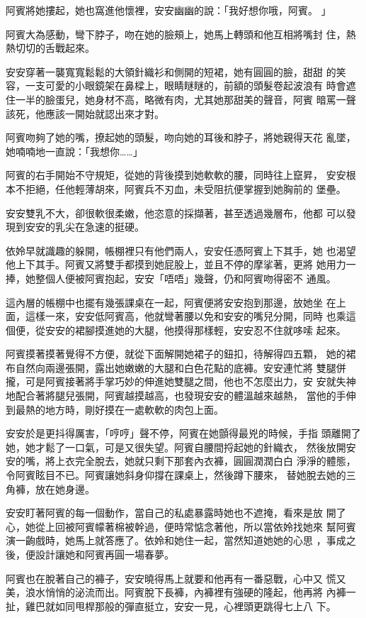 阿賓將她摟起，她也窩進他懷裡，安安幽幽的說：「我好想你哦，阿賓。
」

阿賓大為感動，彎下脖子，吻在她的臉頰上，她馬上轉頭和他互相將嘴封
住，熱熱切切的舌戰起來。

安安穿著一襲寬寬鬆鬆的大領針織衫和側開的短裙，她有圓圓的臉，甜甜
的笑容，一支可愛的小眼鏡架在鼻樑上，眼睛瞇瞇的，前額的頭髮卷起波浪有
時會遮住一半的臉蛋兒，她身材不高，略微有肉，尤其她那甜美的聲音，阿賓
暗罵一聲該死，他應該一開始就認出來才對。

阿賓吻夠了她的嘴，撩起她的頭髮，吻向她的耳後和脖子，將她親得天花
亂墜，她喃喃地一直說：「我想你……」

阿賓的右手開始不守規矩，從她的背後摸到她軟軟的腰，同時往上竄昇，
安安根本不拒絕，任他輕薄胡來，阿賓兵不刃血，未受阻抗便掌握到她胸前的
堡壘。

安安雙乳不大，卻很軟很柔嫩，他恣意的採擷著，甚至透過幾層布，他都
可以發現到安安的乳尖在急速的挺硬。

依姈早就識趣的躲開，帳棚裡只有他們兩人，安安任憑阿賓上下其手，她
也渴望他上下其手。阿賓又將雙手都摸到她屁股上，並且不停的摩挲著，更將
她用力一捧，她整個人便被阿賓抱起，安安「唔唔」幾聲，仍和阿賓吻得密不
通風。

這內層的帳棚中也擺有幾張課桌在一起，阿賓便將安安抱到那邊，放她坐
在上面，這樣一來，安安低阿賓高，他就彎著腰以免和安安的嘴兒分開，同時
也乘這個便，從安安的裙腳摸進她的大腿，他摸得那樣輕，安安忍不住就哆嗦
起來。

阿賓摸著摸著覺得不方便，就從下面解開她裙子的鈕扣，待解得四五顆，
她的裙布自然向兩邊張開，露出她嫩嫩的大腿和白色花點的底褲。安安連忙將
雙腿併攏，可是阿賓接著將手掌巧妙的伸進她雙腿之間，他也不怎麼出力，安
安就失神地配合著將腿兒張開，阿賓越摸越高，也發現安安的體溫越來越熱，
當他的手伸到最熱的地方時，剛好摸在一處軟軟的肉包上面。

安安於是更抖得厲害，「哼哼」聲不停，阿賓在她顫得最兇的時候，手指
頭離開了她，她才鬆了一口氣，可是又很失望。阿賓自腰間捋起她的針織衣，
然後放開安安的嘴，將上衣完全脫去，她就只剩下那套內衣褲，圓圓潤潤白白
淨淨的體態，令阿賓眩目不已。阿賓讓她斜身仰撐在課桌上，然後蹲下腰來，
替她脫去她的三角褲，放在她身邊。

安安盯著阿賓的每一個動作，當自己的私處暴露時她也不遮掩，看來是放
開了心，她從上回被阿賓幪著棉被幹過，便時常惦念著他，所以當依姈找她來
幫阿賓演一齣戲時，她馬上就答應了。依姈和她住一起，當然知道她她的心思
，事成之後，便設計讓她和阿賓再圓一場春夢。

阿賓也在脫著自己的褲子，安安曉得馬上就要和他再有一番惡戰，心中又
慌又美，浪水悄悄的泌流而出。阿賓脫下長褲，內褲裡有強硬的隆起，他再將
內褲一扯，雞巴就如同甩桿那般的彈直挺立，安安一見，心裡頭更跳得七上八
下。

